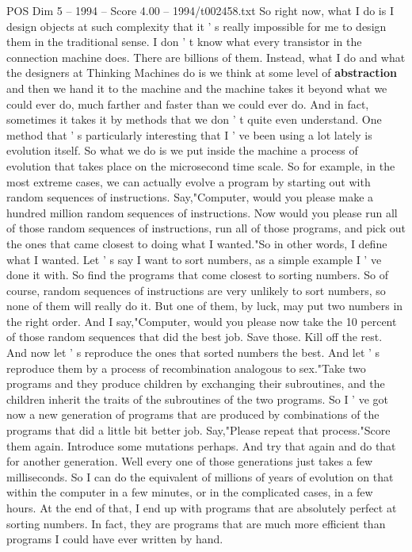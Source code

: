 \begin{textsample}{POS Dim 5 – 1994 – Score 4.00 – 1994/t002458.txt}
So right now, what I do is I design objects at such complexity that it ' s really impossible for me to design them in the traditional sense.
I don ' t know what every transistor in the connection machine does.
There are billions of them.
Instead, what I do and what the designers at Thinking Machines do is we think at some level of \textbf{abstraction} and then we hand it to the machine and the machine takes it beyond what we could ever do, much farther and faster than we could ever do.
And in fact, sometimes it takes it by methods that we don ' t quite even understand.
One method that ' s particularly interesting that I ' ve been using a lot lately is evolution itself.
So what we do is we put inside the machine a process of evolution that takes place on the microsecond time scale.
So for example, in the most extreme cases, we can actually evolve a program by starting out with random sequences of instructions.
Say,"Computer, would you please make a hundred million random sequences of instructions.
Now would you please run all of those random sequences of instructions, run all of those programs, and pick out the ones that came closest to doing what I wanted."So in other words, I define what I wanted.
Let ' s say I want to sort numbers, as a simple example I ' ve done it with.
So find the programs that come closest to sorting numbers.
So of course, random sequences of instructions are very unlikely to sort numbers, so none of them will really do it.
But one of them, by luck, may put two numbers in the right order.
And I say,"Computer, would you please now take the 10 percent of those random sequences that did the best job.
Save those.
Kill off the rest.
And now let ' s reproduce the ones that sorted numbers the best.
And let ' s reproduce them by a process of recombination analogous to sex."Take two programs and they produce children by exchanging their subroutines, and the children inherit the traits of the subroutines of the two programs.
So I ' ve got now a new generation of programs that are produced by combinations of the programs that did a little bit better job.
Say,"Please repeat that process."Score them again.
Introduce some mutations perhaps.
And try that again and do that for another generation.
Well every one of those generations just takes a few milliseconds.
So I can do the equivalent of millions of years of evolution on that within the computer in a few minutes, or in the complicated cases, in a few hours.
At the end of that, I end up with programs that are absolutely perfect at sorting numbers.
In fact, they are programs that are much more efficient than programs I could have ever written by hand.

\end{textsample}
